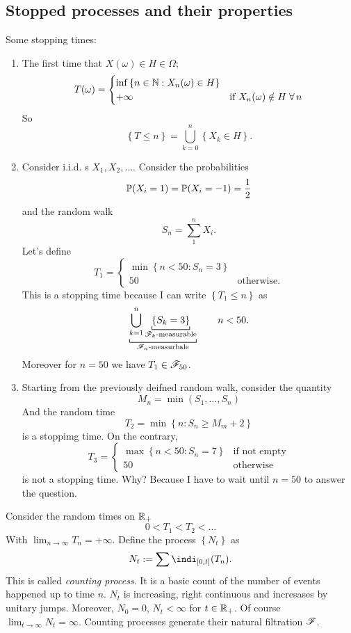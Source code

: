 \documentclass{report}
\begin{document}
\subsection{Stopped processes and their properties}
\begin{example}
	Some stopping times:
	\begin{enumerate}[\circnum]
		\item The first time that $X(\omega)\in H\in\Omega$;
		\[T(\omega)=\begin{cases}
			\inf \left\{n\in\mathbb{N}:X_n(\omega)\in H\right\}&\\
			+\infty&\text{if $X_n(\omega)\notin H\;\forall\, n$}
		\end{cases}\]
		So
		\[\left\{T\leq n\right\}=\bigcup_{k=0}^{n}\left\{X_k\in H\right\}.\]
		\item Consider i.i.d. \rv{}s 
		$X_1,X_2,\ldots$. Consider the probabilities
		\[\mathbb{P}(X_i=1)=\mathbb{P}(X_i=-1)=\frac{1}{2}\]
		and the random walk
		\[S_n=\sum_{1}^{n}X_i.\]
		Let's define 
		\[T_1=\begin{cases}
			\min\left\{n<50:S_n=3\right\}\\
			50 &\text{otherwise}.
		\end{cases}\]
		This is a stopping time because I can write $\left\{T_1\leq n\right\}$ as $$\underbracket[0.6pt]{\bigcup_{k=1}^{n}\underbracket[0.6pt]{\left\{S_k=3\right\}}_{\text{$\F_k$-measurable}}}_{\mathclap{\text{$\F_n$-measurbale}}}\qquad n<50.$$
		Moreover for $n=50$ we have $T_{1}\in\mathscr{F}_{50}$.
		\item Starting from the previously deifned random walk, consider the quantity 
		\[M_n=\min(S_1,\ldots,S_n)\]
		And the random time
		\[T_2=\min\left\{n:S_n\geq M_m+2\right\}\]
		is a stoppimg time. On the contrary, 
		\[T_3=\begin{cases}
			\max\left\{n<50:S_n=7\right\}&\text{if not empty}\\
			50 &\text{otherwise}
		\end{cases}\]
		is not a stopping time. Why? Because I have to wait until $n=50$ to answer the question. 
	\end{enumerate}
\end{example}

Consider the random times on $\mathbb{R}_+$
\[0<T_1<T_2<\ldots\]
With $\lim_{n\to\infty}T_n=+\infty$. Define the process $\left\{N_t\right\}$ as 
\[N_t:=\sum\indi_{[0,t]}(T_n).\]
This is called \emph{counting process}. It is a basic count of the number of events happened up to time $n$.
$N_{t}$ is increasing, right continuous and incresases by unitary jumps. Moreover, $N_0=0$, $N_t<\infty$ for $t\in\mathbb{R}_+$. Of course $\lim_{t\to\infty}N_t=\infty$. Counting processes generate their natural filtration $\mathscr{F}$.
\end{document}
